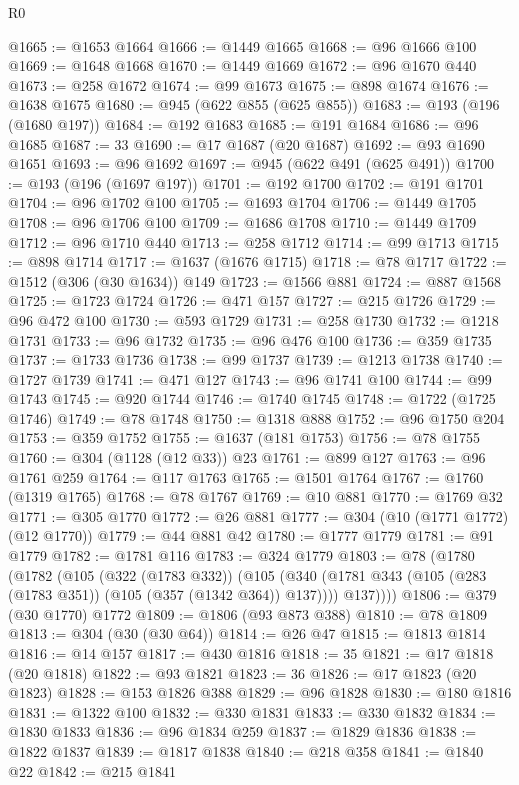 \begin{lexlean}{R0}
\begin{coremodule}
@1665 := @1653 @1664
@1666 := @1449 @1665
@1668 := @96 @1666 @100
@1669 := @1648 @1668
@1670 := @1449 @1669
@1672 := @96 @1670 @440
@1673 := @258 @1672
@1674 := @99 @1673
@1675 := @898 @1674
@1676 := @1638 @1675
@1680 := @945 (@622 @855 (@625 @855))
@1683 := @193 (@196 (@1680 @197))
@1684 := @192 @1683
@1685 := @191 @1684
@1686 := @96 @1685
@1687 := 33
@1690 := @17 @1687 (@20 @1687)
@1692 := @93 @1690 @1651
@1693 := @96 @1692
@1697 := @945 (@622 @491 (@625 @491))
@1700 := @193 (@196 (@1697 @197))
@1701 := @192 @1700
@1702 := @191 @1701
@1704 := @96 @1702 @100
@1705 := @1693 @1704
@1706 := @1449 @1705
@1708 := @96 @1706 @100
@1709 := @1686 @1708
@1710 := @1449 @1709
@1712 := @96 @1710 @440
@1713 := @258 @1712
@1714 := @99 @1713
@1715 := @898 @1714
@1717 := @1637 (@1676 @1715)
@1718 := @78 @1717
@1722 := @1512 (@306 (@30 @1634)) @149
@1723 := @1566 @881
@1724 := @887 @1568
@1725 := @1723 @1724
@1726 := @471 @157
@1727 := @215 @1726
@1729 := @96 @472 @100
@1730 := @593 @1729
@1731 := @258 @1730
@1732 := @1218 @1731
@1733 := @96 @1732
@1735 := @96 @476 @100
@1736 := @359 @1735
@1737 := @1733 @1736
@1738 := @99 @1737
@1739 := @1213 @1738
@1740 := @1727 @1739
@1741 := @471 @127
@1743 := @96 @1741 @100
@1744 := @99 @1743
@1745 := @920 @1744
@1746 := @1740 @1745
@1748 := @1722 (@1725 @1746)
@1749 := @78 @1748
@1750 := @1318 @888
@1752 := @96 @1750 @204
@1753 := @359 @1752
@1755 := @1637 (@181 @1753)
@1756 := @78 @1755
@1760 := @304 (@1128 (@12 @33)) @23
@1761 := @899 @127
@1763 := @96 @1761 @259
@1764 := @117 @1763
@1765 := @1501 @1764
@1767 := @1760 (@1319 @1765)
@1768 := @78 @1767
@1769 := @10 @881
@1770 := @1769 @32
@1771 := @305 @1770
@1772 := @26 @881
@1777 := @304 (@10 (@1771 @1772) (@12 @1770))
@1779 := @44 @881 @42
@1780 := @1777 @1779
@1781 := @91 @1779
@1782 := @1781 @116
@1783 := @324 @1779
@1803 := @78
    (@1780
      (@1782
        (@105
          (@322 (@1783 @332))
          (@105
            (@340 (@1781 @343 (@105 (@283 (@1783 @351)) (@105 (@357 (@1342 @364)) @137))))
            @137))))
@1806 := @379 (@30 @1770) @1772
@1809 := @1806 (@93 @873 @388)
@1810 := @78 @1809
@1813 := @304 (@30 (@30 @64))
@1814 := @26 @47
@1815 := @1813 @1814
@1816 := @14 @157
@1817 := @430 @1816
@1818 := 35
@1821 := @17 @1818 (@20 @1818)
@1822 := @93 @1821
@1823 := 36
@1826 := @17 @1823 (@20 @1823)
@1828 := @153 @1826 @388
@1829 := @96 @1828
@1830 := @180 @1816
@1831 := @1322 @100
@1832 := @330 @1831
@1833 := @330 @1832
@1834 := @1830 @1833
@1836 := @96 @1834 @259
@1837 := @1829 @1836
@1838 := @1822 @1837
@1839 := @1817 @1838
@1840 := @218 @358
@1841 := @1840 @22
@1842 := @215 @1841

\end{coremodule}
\end{lexlean}
